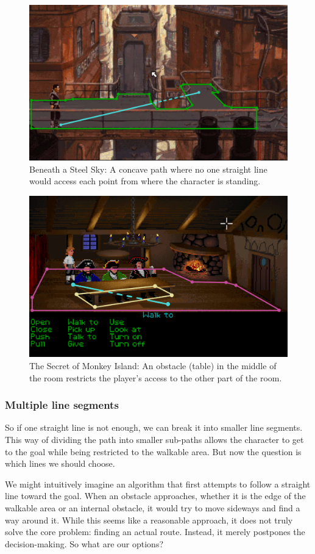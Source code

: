 \begin{figure}[H]
\centering
\includegraphics[width=.7\linewidth]{img/Path-BaSS2.png}
\caption{Beneath a Steel Sky: A concave path where no one straight line would access each point from where the character is standing.}
\label{fig:Path-B}
\end{figure}

\begin{figure}[H]
\centering
\includegraphics[width=.7\linewidth]{img/Path-TSoMI2.png}
\caption{The Secret of Monkey Island: An obstacle (table) in the middle of the room restricts the player's access to the other part of the room.}
\label{fig:Path-M}
\end{figure}

\subsubsection{Multiple line segments}
So if one straight line is not enough, we can break it into smaller line segments. This way of dividing the path into smaller sub-paths allows the character to get to the goal while being restricted to the walkable area. But now the question is which lines we should choose.

We might intuitively imagine an algorithm that first attempts to follow a straight line toward the goal. When an obstacle approaches, whether it is the edge of the walkable area or an internal obstacle, it would try to move sideways and find a way around it. While this seems like a reasonable approach, it does not truly solve the core problem: finding an actual route. Instead, it merely postpones the decision-making. So what are our options?

